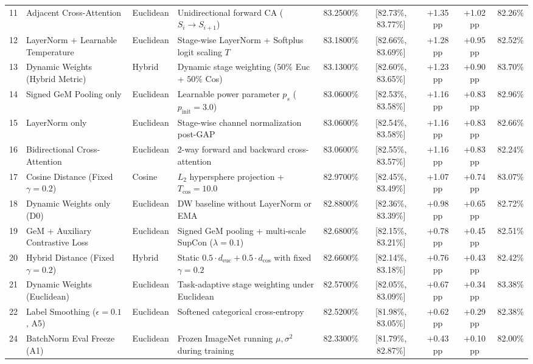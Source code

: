 \documentclass[conference]{IEEEtran}
\begin{document}
\begin{table}[t]
{\begin{tabular}{clllccccr}
11 & Adjacent Cross-Attention & Euclidean & Unidirectional forward CA ($S_i \to S_{i+1}$) & 83.2500\% & [82.73\%, 83.77\%] & +1.35 pp & +1.02 pp & 82.26\% \\
12 & LayerNorm + Learnable Temperature & Euclidean & Stage-wise LayerNorm + Softplus logit scaling $T$ & 83.1800\% & [82.66\%, 83.69\%] & +1.28 pp & +0.95 pp & 82.52\% \\
13 & Dynamic Weights (Hybrid Metric) & Hybrid & Dynamic stage weighting ($50\%$ Euc + $50\%$ Cos) & 83.1300\% & [82.60\%, 83.65\%] & +1.23 pp & +0.90 pp & 83.70\% \\
14 & Signed GeM Pooling only & Euclidean & Learnable power parameter $p_s$ ($p_{\text{init}}=3.0$) & 83.0600\% & [82.53\%, 83.58\%] & +1.16 pp & +0.83 pp & 82.96\% \\
15 & LayerNorm only & Euclidean & Stage-wise channel normalization post-GAP & 83.0600\% & [82.54\%, 83.58\%] & +1.16 pp & +0.83 pp & 82.66\% \\
16 & Bidirectional Cross-Attention & Euclidean & 2-way forward and backward cross-attention & 83.0600\% & [82.55\%, 83.57\%] & +1.16 pp & +0.83 pp & 82.24\% \\
17 & Cosine Distance (Fixed $\gamma=0.2$) & Cosine & $L_2$ hypersphere projection + $T_{\cos}=10.0$ & 82.9700\% & [82.45\%, 83.49\%] & +1.07 pp & +0.74 pp & 83.07\% \\
18 & Dynamic Weights only (D0) & Euclidean & DW baseline without LayerNorm or EMA & 82.8800\% & [82.36\%, 83.39\%] & +0.98 pp & +0.65 pp & 82.72\% \\
19 & GeM + Auxiliary Contrastive Loss & Euclidean & Signed GeM pooling + multi-scale SupCon ($\lambda=0.1$) & 82.6800\% & [82.15\%, 83.21\%] & +0.78 pp & +0.45 pp & 82.51\% \\
20 & Hybrid Distance (Fixed $\gamma=0.2$) & Hybrid & Static $0.5 \cdot d_{\text{euc}} + 0.5 \cdot d_{\cos}$ with fixed $\gamma=0.2$ & 82.6600\% & [82.14\%, 83.18\%] & +0.76 pp & +0.43 pp & 82.42\% \\
21 & Dynamic Weights (Euclidean) & Euclidean & Task-adaptive stage weighting under Euclidean & 82.5700\% & [82.05\%, 83.09\%] & +0.67 pp & +0.34 pp & 83.38\% \\
22 & Label Smoothing ($\epsilon=0.1$, A5) & Euclidean & Softened categorical cross-entropy & 82.5200\% & [81.98\%, 83.05\%] & +0.62 pp & +0.29 pp & 82.38\% \\
24 & BatchNorm Eval Freeze (A1) & Euclidean & Frozen ImageNet running $\mu, \sigma^2$ during training & 82.3300\% & [81.79\%, 82.87\%] & +0.43 pp & +0.10 pp & 82.00\% \\

\end{tabular}}
\end{table}
\end{document}
